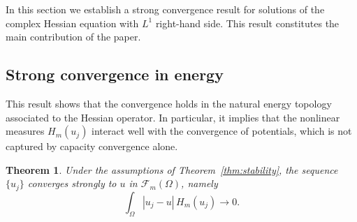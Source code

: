 \documentclass[11pt,reqno]{amsart}
\newtheorem{theorem}{Theorem}[section]
\theoremstyle{definition}
\theoremstyle{remark}
\begin{document}
	In this section we establish a strong convergence result for solutions of the complex Hessian equation with $L^1$ right-hand side.
	This result constitutes the main contribution of the paper.	
	

	
	
	
	
	\subsection{Strong convergence in energy}
	
This result shows that the convergence holds in the natural
energy topology associated to the Hessian operator.
In particular, it implies that the nonlinear measures $H_m(u_j)$
interact well with the convergence of potentials,
which is not captured by capacity convergence alone.
	
	\begin{theorem}\label{thm:strong}
		Under the assumptions of Theorem~\ref{thm:stability}, the sequence $\{u_j\}$ converges strongly to $u$ in $\mathcal{F}_m(\Omega)$, namely
		\[
		\int_\Omega |u_j - u| \, H_m(u_j) \longrightarrow 0.
		\]
	\end{theorem}
	
\end{document}

